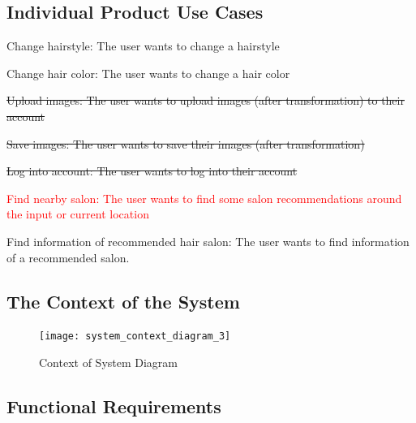 \documentclass[12pt]{article}
\begin{document}
\subsection{Individual Product Use Cases}
\begin{UC}
    \item Change hairstyle: The user wants to change a hairstyle
    \item Change hair color: The user wants to change a hair color
    \item \sout{Upload images: The user wants to upload images (after transformation) to their account}
    \item \sout{Save images: The user wants to save their images (after transformation)}
    \item \sout{Log into account: The user wants to log into their account}
    \item \textcolor{red}{Find nearby salon: The user wants to find some salon recommendations around the input or current location}
    \item Find information of recommended hair salon: The user wants to find information of a recommended salon.
\end{UC}

\subsection{The Context of the System}
\begin{figure}[h!]
\begin{center}
 \texttt{[image: system\_context\_diagram\_3]}
\caption{Context of System Diagram}
\end{center}
\end{figure}

\subsection{Functional Requirements }
\end{document}

